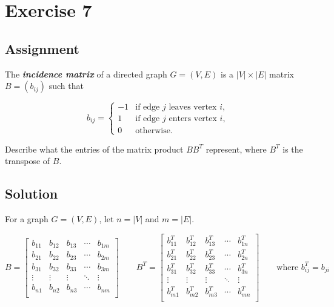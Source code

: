 
\section*{Exercise 7}
\label{sec:Ex7}

\subsection*{Assignment}
The \textit{\textbf{incidence matrix}} of a directed graph $G = (V, E)$ is
a $|V| \times |E|$ matrix $B = (b_{ij})$ such that

$$
b_{ij} =
  \left\{
  \begin{array}{ll}
    -1 & \mbox{if edge $j$ leaves vertex $i$,} \\
     1 & \mbox{if edge $j$ enters vertex $i$,} \\
     0 & \mbox{otherwise}.
  \end{array}
  \right.
$$

Describe what the entries of the matrix product $B B^{T}$ represent, where
$B^{T}$ is the transpose of $B$.

\subsection*{Solution}

For a graph $G = (V, E)$, let $n = |V|$ and $m = |E|$.

$$
B =
\left[
\begin{array}{*{5}{c}}
  b_{11} & b_{12} & b_{13} & \cdots & b_{1m} \\
  b_{21} & b_{22} & b_{23} & \cdots & b_{2m} \\
  b_{31} & b_{32} & b_{33} & \cdots & b_{3m} \\
  \vdots & \vdots & \vdots & \ddots & \vdots \\
  b_{n1} & b_{n2} & b_{n3} & \cdots & b_{nm} \\
\end{array}
\right]
\qquad
B^{T} =
\left[
\begin{array}{*{5}{c}}
  b^{T}_{11} & b^{T}_{12} & b^{T}_{13} & \cdots & b^{T}_{1n} \\
  b^{T}_{21} & b^{T}_{22} & b^{T}_{23} & \cdots & b^{T}_{2n} \\
  b^{T}_{31} & b^{T}_{32} & b^{T}_{33} & \cdots & b^{T}_{3n} \\
  \vdots & \vdots & \vdots & \ddots & \vdots \\
  b^{T}_{m1} & b^{T}_{m2} & b^{T}_{m3} & \cdots & b^{T}_{mn} \\
\end{array}
\right]
\qquad
\mbox{where $b^{T}_{ij} = b_{ji}$}
$$

